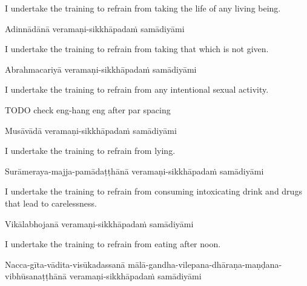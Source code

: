 \begin{english-hang}
  I undertake the training to refrain from taking the life of any living being.
\end{english-hang}

Adinnādānā veramaṇi-sikkhāpadaṁ samādiyāmi

\begin{english-hang}
  I undertake the training to refrain from taking that which is not given.
\end{english-hang}

Abrahmacariyā veramaṇi-sikkhāpadaṁ samādiyāmi

\begin{english-hang}
  I undertake the training to refrain from any intentional sexual activity.
\end{english-hang}

TODO check eng-hang eng after par spacing

Musāvādā veramaṇi-sikkhāpadaṁ samādiyāmi

\begin{english}
  I undertake the training to refrain from lying.
\end{english}

\begin{pali-hang}
  Surāmeraya-majja-pamādaṭṭhānā veramaṇi-sikkhāpadaṁ samādiyāmi
\end{pali-hang}

\begin{english-hang}
  I undertake the training to refrain from consuming intoxicating drink and drugs that\hyperlink{endnote141-appendix}{\hypertarget{endnote141-body}{}}
  lead to carelessness.
\end{english-hang}

Vikālabhojanā veramaṇi-sikkhāpadaṁ samādiyāmi

\begin{english}
  I undertake the training to refrain from eating after noon.\hyperlink{endnote142-appendix}{\hypertarget{endnote142-body}{}}
\end{english}

\begin{pali-hang}
  Nacca-gīta-vādita-visūkadassanā mālā-gandha-vilepana-dhāraṇa-maṇḍana-vibhūsanaṭṭhānā veramaṇi-sikkhāpadaṁ samādiyāmi
\end{pali-hang}

